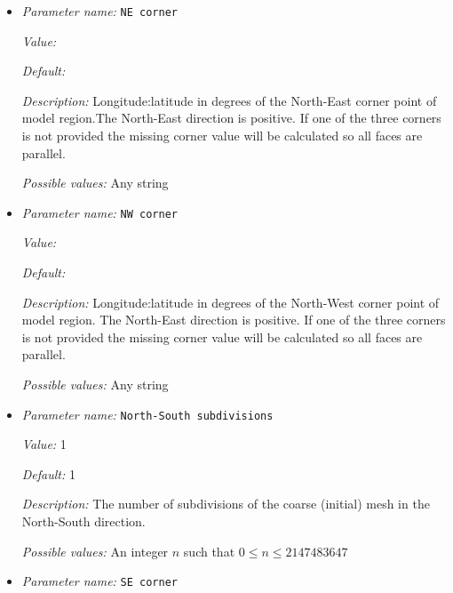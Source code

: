 \begin{itemize}
{\it Default:} 8.1819190842622e-2


{\it Description:} Eccentricity of the ellipsoid. Zero is a perfect sphere, default (8.1819190842622e-2) is WGS84.


{\it Possible values:} A floating point number $v$ such that $0 \leq v \leq \text{MAX\_DOUBLE}$
\item {\it Parameter name:} {\tt NE corner}
\label{parameters:Geometry model/Ellipsoidal chunk/NE corner}


{\it Value:} 


{\it Default:} 


{\it Description:} Longitude:latitude in degrees of the North-East corner point of model region.The North-East direction is positive. If one of the three corners is not provided the missing corner value will be calculated so all faces are parallel.


{\it Possible values:} Any string
\item {\it Parameter name:} {\tt NW corner}
\label{parameters:Geometry model/Ellipsoidal chunk/NW corner}


{\it Value:} 


{\it Default:} 


{\it Description:} Longitude:latitude in degrees of the North-West corner point of model region. The North-East direction is positive. If one of the three corners is not provided the missing corner value will be calculated so all faces are parallel.


{\it Possible values:} Any string
\item {\it Parameter name:} {\tt North-South subdivisions}
\label{parameters:Geometry model/Ellipsoidal chunk/North-South subdivisions}


{\it Value:} 1


{\it Default:} 1


{\it Description:} The number of subdivisions of the coarse (initial) mesh in the North-South direction.


{\it Possible values:} An integer $n$ such that $0\leq n \leq 2147483647$
\item {\it Parameter name:} {\tt SE corner}
\label{parameters:Geometry model/Ellipsoidal chunk/SE corner}



\end{itemize}
